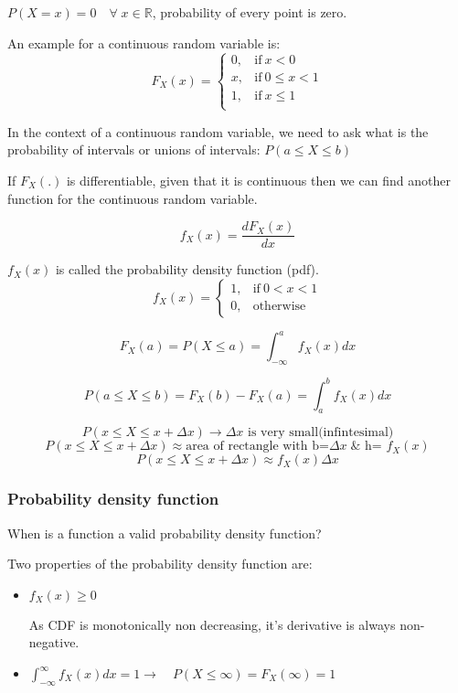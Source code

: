 \documentclass{article}
\begin{document}
$P(X=x)=0 \quad \forall \; x \in \mathbb{R}$, probability of every point is zero.

An example for a continuous random variable is:
\begin{equation*}
    F_X (x)=
    \begin{cases}
      0, & \text{if}\ x < 0 \\
      x, & \text{if}\ 0 \leq x < 1 \\
      1, & \text{if}\ x\leq 1  \\
    \end{cases}
\end{equation*}

In the context of a continuous random variable, we need to ask what is the probability of intervals or unions of intervals: $ P(a \leq X \leq b)$

If $F_X(.)$ is differentiable, given that it is continuous then we can find another function for the continuous random variable.

$$ f_X(x)= \frac{dF_X(x)}{dx}$$

$f_X(x)$ is called the probability density function (pdf).
\begin{equation*}
    f_X (x)=
    \begin{cases}
      1, & \text{if}\ 0 < x < 1 \\
      0, & \text{otherwise}\
    \end{cases}
\end{equation*}

$$ F_X(a)= P(X \leq a)= \int_{-\infty}^{a}f_X(x)dx$$

$$  P(a \leq X \leq b)=F_X(b)-F_X(a) = \int_{a}^{b}f_X(x)dx$$

$$ P(x \leq X \leq x + \Delta x) \to \Delta x\text{ is very small(infintesimal)}$$
$$ P(x \leq X \leq x + \Delta x) \approx \text{area of rectangle with b=} \Delta x \;\& \text{ h= }f_X(x)$$
$$ P(x \leq X \leq x + \Delta x) \approx f_X(x) \Delta x$$

\subsubsection{Probability density function}
When is a function a valid probability density function?

Two properties of the probability density function are:
\begin{itemize}
    \item $f_X(x) \geq 0$

    As CDF is monotonically non decreasing, it's derivative is always non-negative.
    \item $ \int_{-\infty}^{\infty}f_X(x)dx= 1 \to \quad P(X \leq \infty )= F_X(\infty)=1$
\end{itemize}
\end{document}
